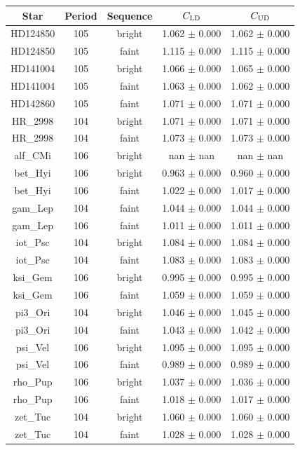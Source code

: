 \begin{tabular}{ccccc}
\hline
Star & Period & Sequence & $C_{\rm LD}$ & $C_{\rm UD}$ \\
\hline
HD124850 & 105 & bright & 1.062 $\pm$ 0.000 & 1.062 $\pm$ 0.000\\
HD124850 & 105 & faint & 1.115 $\pm$ 0.000 & 1.115 $\pm$ 0.000\\
HD141004 & 105 & bright & 1.066 $\pm$ 0.000 & 1.065 $\pm$ 0.000\\
HD141004 & 105 & faint & 1.063 $\pm$ 0.000 & 1.062 $\pm$ 0.000\\
HD142860 & 105 & faint & 1.071 $\pm$ 0.000 & 1.071 $\pm$ 0.000\\
HR_2998 & 104 & bright & 1.071 $\pm$ 0.000 & 1.071 $\pm$ 0.000\\
HR_2998 & 104 & faint & 1.073 $\pm$ 0.000 & 1.073 $\pm$ 0.000\\
alf_CMi & 106 & bright & nan $\pm$ nan & nan $\pm$ nan\\
bet_Hyi & 106 & bright & 0.963 $\pm$ 0.000 & 0.960 $\pm$ 0.000\\
bet_Hyi & 106 & faint & 1.022 $\pm$ 0.000 & 1.017 $\pm$ 0.000\\
gam_Lep & 104 & faint & 1.044 $\pm$ 0.000 & 1.044 $\pm$ 0.000\\
gam_Lep & 106 & faint & 1.011 $\pm$ 0.000 & 1.011 $\pm$ 0.000\\
iot_Psc & 104 & bright & 1.084 $\pm$ 0.000 & 1.084 $\pm$ 0.000\\
iot_Psc & 104 & faint & 1.083 $\pm$ 0.000 & 1.083 $\pm$ 0.000\\
ksi_Gem & 106 & bright & 0.995 $\pm$ 0.000 & 0.995 $\pm$ 0.000\\
ksi_Gem & 106 & faint & 1.059 $\pm$ 0.000 & 1.059 $\pm$ 0.000\\
pi3_Ori & 104 & bright & 1.046 $\pm$ 0.000 & 1.045 $\pm$ 0.000\\
pi3_Ori & 104 & faint & 1.043 $\pm$ 0.000 & 1.042 $\pm$ 0.000\\
psi_Vel & 106 & bright & 1.095 $\pm$ 0.000 & 1.095 $\pm$ 0.000\\
psi_Vel & 106 & faint & 0.989 $\pm$ 0.000 & 0.989 $\pm$ 0.000\\
rho_Pup & 106 & bright & 1.037 $\pm$ 0.000 & 1.036 $\pm$ 0.000\\
rho_Pup & 106 & faint & 1.018 $\pm$ 0.000 & 1.017 $\pm$ 0.000\\
zet_Tuc & 104 & bright & 1.060 $\pm$ 0.000 & 1.060 $\pm$ 0.000\\
zet_Tuc & 104 & faint & 1.028 $\pm$ 0.000 & 1.028 $\pm$ 0.000\\
\hline
\end{tabular}
